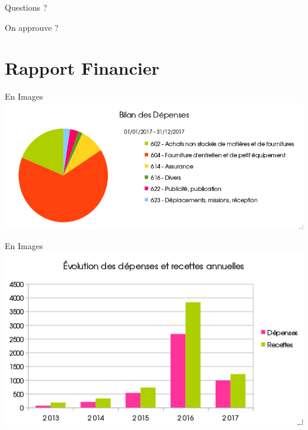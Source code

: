 \documentclass[10pt]{beamer}
\begin{document}
\begin{frame}[standout]
	Questions ?
\end{frame}

\begin{frame}[standout]
	On approuve ?
\end{frame}

\section{Rapport Financier}

\begin{frame}{En Images}
	\center
	\includegraphics[width=\linewidth]{../convocation/2DossierAGDepenses2017.png}
\end{frame}

\begin{frame}{En Images}
	\center
	\includegraphics[width=\linewidth]{../convocation/3DossierAGGeneral2017.png}
\end{frame}
\end{document}
